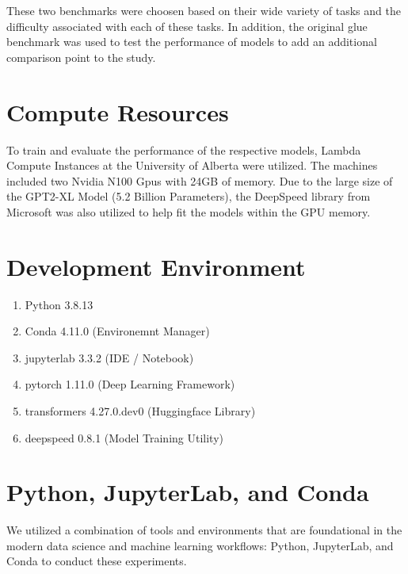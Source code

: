 \documentclass[\main/thesis.tex]{subfiles}
\begin{document}
These two benchmarks were choosen based on their wide variety of tasks and the difficulty 
associated with each of these tasks. In addition, the original glue benchmark was used to test the performance of 
models to add an additional comparison point to the study. 


\section{Compute Resources}\label{sec:computeResources}
To train and evaluate the performance of the respective models, Lambda Compute Instances at the University of Alberta 
were utilized. The machines included two Nvidia N100 Gpus with 24GB of memory. Due to the large size of the GPT2-XL 
Model (5.2 Billion Parameters), the DeepSpeed\cite{rajbhandari_zero_2020} library from Microsoft was also utilized to 
help fit the models within the GPU memory. 

\section{Development Environment}
\begin{enumerate}
    \item Python 3.8.13
    \item Conda 4.11.0 (Environemnt Manager)
    \item jupyterlab 3.3.2 (IDE / Notebook)
    \item pytorch 1.11.0 (Deep Learning Framework)
    \item transformers 4.27.0.dev0 (Huggingface Library)
    \item deepspeed 0.8.1 (Model Training Utility)
\end{enumerate}


\section{Python, JupyterLab, and Conda}\label{sec:python}

We utilized a combination of tools and environments that are foundational in the modern data science and machine 
learning workflows: Python, JupyterLab, and Conda to conduct these experiments. 
\end{document}
